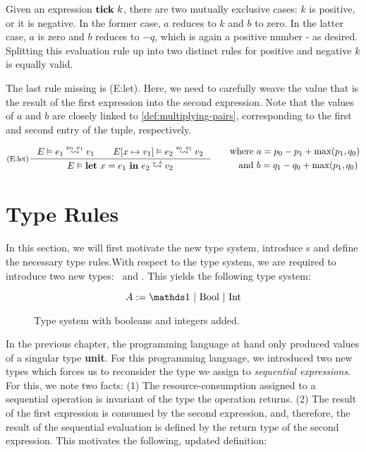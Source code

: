 Given an expression \(\mathbf{tick}~k\), there are two mutually exclusive cases: \(k\) is positive, or it is negative. In the former case, \(a\) reduces to \(k\) and \(b\) to zero. In the latter case, \(a\) is zero and \(b\) reduces to \(-q\), which is again a positive number - as desired. Splitting this evaluation rule up into two distinct rules for positive and negative \(k\) is equally valid.

The last rule missing is (E:let). Here, we need to carefully weave the value that is the result of the first expression into the second expression. Note that the values of \(a\) and \(b\) are closely linked to \cref{def:multiplying-pairs}, corresponding to the first and second entry of the tuple, respectively.

\[
   \inference[(E:let)]
   {\evals{E}{e_1}{v_1}{p_0}{p_1} \qquad \evals{\envaugment{E}{x}{v_1}}{e_2}{v_2}{q_0}{q_1}}
   {\evals{E}{\letexp{x}{e_1}{e_2}}{v_2}{a}{b}}%
   \qquad
   \begin{aligned}
      \text{where }  &a = p_0 - p_1 + \max(p_1, q_0)\\
      \text{and }    &b = q_1 - q_0 + \max(p_1, q_0) 
   \end{aligned}
\]


\section{Type Rules}\label{sec:type-rules-5}

In this section, we will first motivate the new type system, introduce s and define the necessary type rules.With respect to the type system, we are required to introduce two new types: \bool~and \typeint. This yields the following type system:

\begin{figure}[H]
   \[A := \unit~|~\text{\bool}~|~\text{\typeint}\]
   \caption{Type system with booleans and integers added.}
   \label{fig:type-system-5}
\end{figure}

In the previous chapter, the programming language at hand only produced values of a singular type \textbf{unit}. For this programming language, we introduced two new types which forces us to reconsider the type we assign to \emph{sequential expressions}. For this, we note two facts: (1) The resource-consumption assigned to a sequential operation is invariant of the type the operation returns. (2) The result of the first expression is consumed by the second expression, and, therefore, the result of the sequential evaluation is defined by the return type of the second expression. This motivates the following, updated definition:

